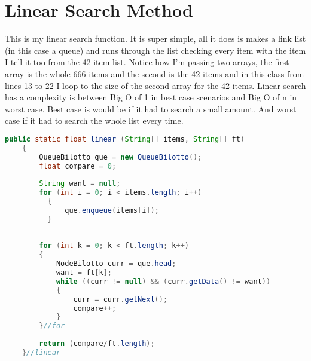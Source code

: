 \documentclass[letterpaper, 10pt]{article}
\begin{document}
\section{Linear Search Method}
This is my linear search function. It is super simple, all it does is makes a link list (in this case a queue) and runs through the list checking every item with the item I tell it too from the 42 item list. Notice how I'm passing two arrays, the first array is the whole 666 items and the second is the 42 items and in this class from lines 13 to 22 I loop to the size of the second array for the 42 items. Linear search has a complexity is between Big O of 1 in best case scenarios and Big O of n in worst case. Best case is would be if it had to search a small amount. And worst case if it had to search the whole list every time.
\begin{lstlisting}[language = java]
public static float linear (String[] items, String[] ft)
	{
		QueueBilotto que = new QueueBilotto();
		float compare = 0;
		
		String want = null;
		for (int i = 0; i < items.length; i++)
	      {
	    	  que.enqueue(items[i]);
	      }
		
		
		for (int k = 0; k < ft.length; k++)
		{
			NodeBilotto curr = que.head;
			want = ft[k];
			while ((curr != null) && (curr.getData() != want))
			{
				curr = curr.getNext();
				compare++;
			}
		}//for
		
		return (compare/ft.length);
	}//linear
\end{lstlisting}
\end{document}
